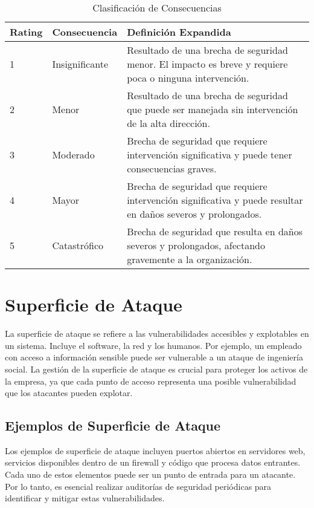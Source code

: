 \begin{table}[h]
    \centering
    \caption{Clasificación de Consecuencias}
 \begin{tabularx}{\textwidth}{@{}XXX@{}}
        \toprule
        \textbf{Rating} & \textbf{Consecuencia} & \textbf{Definición Expandida} \\ \midrule
        1 & Insignificante & Resultado de una brecha de seguridad menor. El impacto es breve y requiere poca o ninguna intervención. \\
        2 & Menor & Resultado de una brecha de seguridad que puede ser manejada sin intervención de la alta dirección. \\
        3 & Moderado & Brecha de seguridad que requiere intervención significativa y puede tener consecuencias graves. \\
        4 & Mayor & Brecha de seguridad que requiere intervención significativa y puede resultar en daños severos y prolongados. \\
        5 & Catastrófico & Brecha de seguridad que resulta en daños severos y prolongados, afectando gravemente a la organización. \\ \bottomrule
     
    \end{tabularx}
  
\end{table}

 


\section{Superficie de Ataque}
La superficie de ataque se refiere a las vulnerabilidades accesibles y explotables en un sistema. Incluye el software, la red y los humanos. Por ejemplo, un empleado con acceso a información sensible puede ser vulnerable a un ataque de ingeniería social. La gestión de la superficie de ataque es crucial para proteger los activos de la empresa, ya que cada punto de acceso representa una posible vulnerabilidad que los atacantes pueden explotar.

\subsection{Ejemplos de Superficie de Ataque}
Los ejemplos de superficie de ataque incluyen puertos abiertos en servidores web, servicios disponibles dentro de un firewall y código que procesa datos entrantes. Cada uno de estos elementos puede ser un punto de entrada para un atacante. Por lo tanto, es esencial realizar auditorías de seguridad periódicas para identificar y mitigar estas vulnerabilidades.

